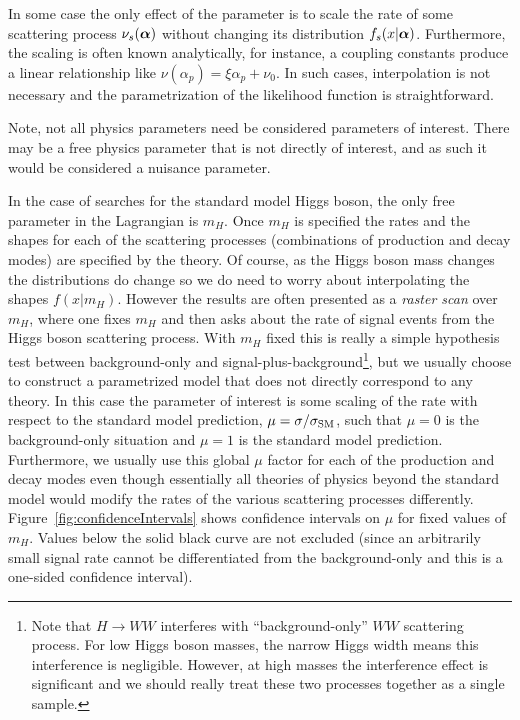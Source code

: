 \documentclass{cernrep}
\def\vec#1{\ifmmode
\mathchoice{\mbox{\boldmath$\displaystyle\bf#1$}}
{\mbox{\boldmath$\textstyle\bf#1$}}
{\mbox{\boldmath$\scriptstyle\bf#1$}}
{\mbox{\boldmath$\scriptscriptstyle\bf#1$}}\else
{\mbox{\boldmath$\bf#1$}}\fi}
\begin{document}
In some case the only effect of the parameter is to scale the rate of some scattering process $\nu_s(\vec\alpha)$ without changing its distribution $f_s(x|\vec\alpha)$.  Furthermore, the scaling is often known analytically, for instance, a coupling constants produce a linear relationship like $\nu(\alpha_p) = \xi \alpha_p  + \nu_0$.  In such cases, interpolation is not necessary and the parametrization of the likelihood function is straightforward.  

Note, not all physics parameters need be considered parameters of interest.  There may be a free physics parameter that is not directly of interest, and as such it would be considered a nuisance parameter.  


In the case of searches for the standard model Higgs boson, the only free parameter in the Lagrangian is $m_H$.  Once $m_H$ is specified the rates and the shapes for each of the scattering processes (combinations of production and decay modes) are specified by the theory.  Of course, as the Higgs boson mass changes the distributions do change so we do need to worry about interpolating the shapes $f(x|m_H)$.  However the results are often presented as a \textit{raster scan} over $m_H$, where one fixes $m_H$ and then asks about the rate of signal events from the Higgs boson scattering process.  With $m_H$ fixed this is really a simple hypothesis test between background-only and signal-plus-background\footnote{Note that  $H\to WW$ interferes with ``background-only'' $WW$ scattering process.  For low Higgs boson masses, the narrow Higgs width means this interference is negligible.  However, at high masses the interference effect is significant and we should really treat these two processes together as a single sample.}, but we usually choose to construct a parametrized model that does not directly correspond to any theory.  In this case the parameter of interest is some scaling of the rate with respect to the standard model prediction, $\mu = \sigma / \sigma_{\rm SM}$, such that $\mu=0$ is the background-only situation and $\mu=1$ is the standard model prediction.  Furthermore, we usually use this global $\mu$ factor for each of the production and decay modes even though essentially all theories of physics beyond the standard model would modify the rates of the various scattering processes differently. Figure~\ref{fig:confidenceIntervals} shows confidence intervals on $\mu$ for fixed values of $m_H$.  Values below the solid black curve are not excluded (since an arbitrarily small signal rate cannot be differentiated from the background-only and this is a one-sided confidence interval).
\end{document}
